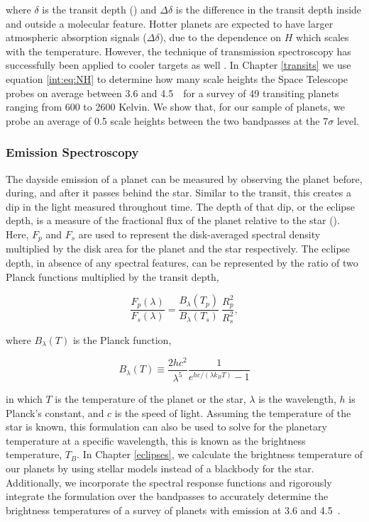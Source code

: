 where $\delta$ is the transit depth (\rprss) and $\Delta\delta$ is the difference in the transit depth inside and outside a molecular feature. Hotter planets are expected to have larger atmospheric absorption signals ($\Delta\delta$), due to the dependence on $H$ which scales with the temperature. However, the technique of transmission spectroscopy has successfully been applied to cooler targets as well \citep[e.g.,][]{Desert2011b, Berta2012, Crossfield2017}. In Chapter \ref{transits} we use equation \ref{int:eq:NH} to determine how many scale heights the \spitzer Space Telescope probes on average between 3.6 and 4.5~\um~for a survey of 49 transiting planets ranging from 600 to 2600 Kelvin. %
We show that, for our sample of planets, we probe an average of 0.5 scale heights between the two \spitzerIRAC bandpasses at the 7$\sigma$ level.

\subsubsection{Emission Spectroscopy}

The dayside emission of a planet can be measured by observing the planet before, during, and after it passes behind the star. Similar to the transit, this creates a dip in the light measured throughout time. The depth of that dip, or the eclipse depth, is a measure of the fractional flux of the planet relative to the star (\fpfs). Here, $F_p$ and $F_s$ are used to represent the disk-averaged spectral density multiplied by the disk area for the planet and the star respectively. The eclipse depth, in absence of any spectral features, can be represented by the ratio of two Planck functions multiplied by the transit depth,

\begin{equation}
\frac{F_p(\lambda)}{F_s(\lambda)} = \frac{B_\lambda(T_p)}{B_\lambda(T_s)}~\frac{R_p^2}{R_s^2},
\end{equation}

where $B_\lambda(T)$ is the Planck function,

\begin{equation}
B_\lambda(T) \equiv \frac{2hc^2}{\lambda^5} \frac{1}{e^{hc/(\lambda k_B T)} - 1}
\end{equation}

in which $T$ is the temperature of the planet or the star, $\lambda$ is the wavelength, $h$ is Planck's constant, and $c$ is the speed of light. Assuming the temperature of the star is known, this formulation can also be used to solve for the planetary temperature at a specific wavelength, this is known as the brightness temperature, $T_B$. In Chapter \ref{eclipses}, we calculate the brightness temperature of our planets by using stellar models instead of a blackbody for the star. Additionally, we incorporate the \spitzer spectral response functions and rigorously integrate the formulation over the bandpasses to accurately determine the brightness temperatures of a survey of planets with emission at 3.6 and 4.5~\um.

